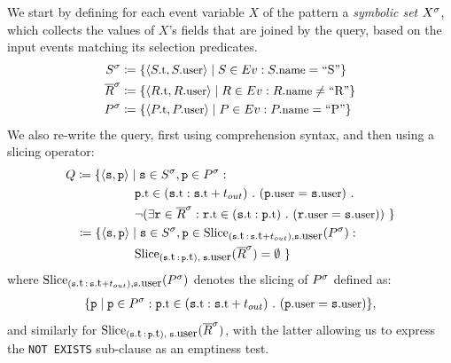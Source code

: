 We start by defining for each event variable $X$ of the pattern a 
{\em symbolic set} ${X}^{\sigma}$, which collects the values of $X$'s fields that 
are joined by the query, based on the input events matching its selection 
predicates. 
\begin{align*}
\syms{S} 
&\coloneq 
\{ \tuple{\facc{S}{t}, \facc{S}{user}} \mid 
S \in \Ev: \facc{S}{name} = \text{``S''}
\}
\\
\syms{\oR} 
&\coloneq 
\{ \tuple{\facc{R}{t}, \facc{R}{user}} \mid 
R \in \Ev: \facc{R}{name} \neq \text{``R''}
\}
\\
\syms{P} 
&\coloneq 
\{ \tuple{\facc{P}{t}, \facc{P}{user}} \mid 
P \in \Ev: \facc{P}{name} = \text{``P''}
\}
\end{align*}
We also re-write the query, first using comprehension syntax, 
and then using a slicing operator:
\begin{align*}
&
Q \coloneq 
\{ \tuple{\symv{s}, \symv{p}} \mid 
\symv{s} \in \syms{S},
\symv{p} \in \syms{P}: 
\\ 
&
\qqquad\quad\;\;
\facc{\symv{p}}{t} \in
(\facc{\symv{s}}{t} : \facc{\symv{s}}{t} + t_{out})\ .\ 
(\facc{\symv{p}}{user} = \facc{\symv{s}}{user})\ .\ 
\\
&\qqquad\quad\;\;
\neg
(\exists
\symv{r} \in \syms{\oR} : 
\facc{\symv{r}}{t} \in (\facc{\symv{s}}{t} : \facc{\symv{p}}{t})\ .\ 
(\facc{\symv{r}}{user} = \facc{\symv{s}}{user})
)
\ \}
\\
&
\;\;\; \coloneq 
\{ \tuple{\symv{s}, \symv{p}} \mid 
\symv{s} \in \syms{S},
\symv{p} \in 
\slice{\syms{P}}
{(\facc{\symv{s}}{t}\,:\,\facc{\symv{s}}{t} + t_{out}),
	\facc{\symv{s}}{user}}
: 
\\ 
&\qqquad\quad\;\;
\slice{\syms{\oR}}
{(\facc{\symv{s}}{t}\,:\,\facc{\symv{p}}{t}),\; \facc{\symv{s}}{user}} 
= \emptyset  
\ \}
\end{align*}
where 
$\slice{\syms{P}}
{(\facc{\symv{s}}{t}\,:\,\facc{\symv{s}}{t} + t_{out}),
	\facc{\symv{s}}{user}}
$
denotes the slicing of ${P}^{\sigma}$ defined as:
\begin{align*}
\{ \symv{p} \mid 
\symv{p} \in \syms{P} : 
\facc{\symv{p}}{t} \in (\facc{\symv{s}}{t} : \facc{\symv{s}}{t} + t_{out})\ .\ 
(\facc{\symv{p}}{user} = \facc{\symv{s}}{user})
\},
\end{align*}
and similarly for
$\slice{\syms{\oR}}
{(\facc{\symv{s}}{t}\,:\,\facc{\symv{p}}{t}),\; \facc{\symv{s}}{user}}$,
with the latter allowing us to express the \texttt{NOT EXISTS} sub-clause as an 
emptiness test.


